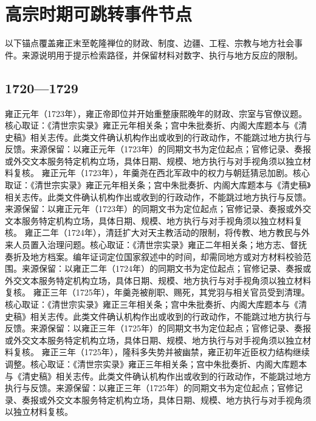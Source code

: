 \section{高宗时期可跳转事件节点}
以下锚点覆盖雍正末至乾隆禅位的财政、制度、边疆、工程、宗教与地方社会事件。来源说明用于提示检索路径，并保留材料对数字、执行与地方反应的限制。
\subsection{1720—1729}
雍正元年（1723年），雍正帝即位并开始重整康熙晚年的财政、宗室与官僚议题。核心取证：《清世宗实录》雍正元年相关条；宫中朱批奏折、内阁大库题本与《清史稿》相关志传。此类文件确认机构作出或收到的行政动作，不能跳过地方执行与反馈。来源保留：以雍正元年（1723年）的同期文书为定位起点；官修记录、奏报或外交文本服务特定机构立场，具体日期、规模、地方执行与对手视角须以独立材料复核。
雍正元年（1723年），年羹尧在西北军政中的权力与朝廷猜忌加剧。核心取证：《清世宗实录》雍正元年相关条；宫中朱批奏折、内阁大库题本与《清史稿》相关志传。此类文件确认机构作出或收到的行政动作，不能跳过地方执行与反馈。来源保留：以雍正元年（1723年）的同期文书为定位起点；官修记录、奏报或外交文本服务特定机构立场，具体日期、规模、地方执行与对手视角须以独立材料复核。
雍正二年（1724年），清廷扩大对天主教活动的限制，将传教、地方教民与外来人员置入治理问题。核心取证：《清世宗实录》雍正二年相关条；地方志、督抚奏折及地方档案。编年证词定位国家叙述中的时间，却需同地方或对方材料校验范围。来源保留：以雍正二年（1724年）的同期文书为定位起点；官修记录、奏报或外交文本服务特定机构立场，具体日期、规模、地方执行与对手视角须以独立材料复核。
雍正三年（1725年），年羹尧被削职、赐死，其党羽与相关官员受到清理。核心取证：《清世宗实录》雍正三年相关条；宫中朱批奏折、内阁大库题本与《清史稿》相关志传。此类文件确认机构作出或收到的行政动作，不能跳过地方执行与反馈。来源保留：以雍正三年（1725年）的同期文书为定位起点；官修记录、奏报或外交文本服务特定机构立场，具体日期、规模、地方执行与对手视角须以独立材料复核。
雍正三年（1725年），隆科多失势并被幽禁，雍正初年近臣权力结构继续调整。核心取证：《清世宗实录》雍正三年相关条；宫中朱批奏折、内阁大库题本与《清史稿》相关志传。此类文件确认机构作出或收到的行政动作，不能跳过地方执行与反馈。来源保留：以雍正三年（1725年）的同期文书为定位起点；官修记录、奏报或外交文本服务特定机构立场，具体日期、规模、地方执行与对手视角须以独立材料复核。
